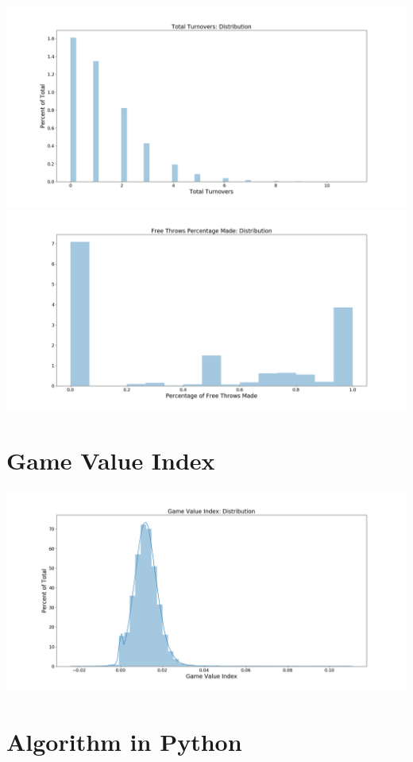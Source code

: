 \documentclass[12pt, authoryear]{elsarticle}
\begin{document}
\includegraphics[scale=0.3]{Turnovers_Distribution}\\
\includegraphics[scale=0.3]{Free_Throw_Percent_Distribution}\\

\section{Game Value Index} \label{game_value_dist}
\includegraphics[scale=0.3]{gamevalueIndex}\\

\section{Algorithm in Python} \label{algo}

\end{document}
